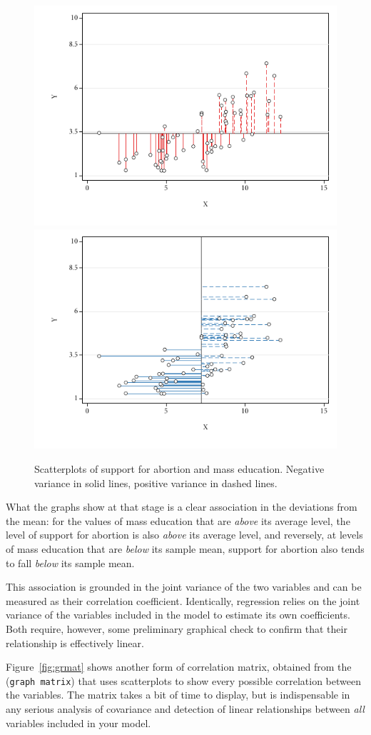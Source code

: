   \begin{figure}[htp]
  	\centering
  	\includegraphics[width=.48\textwidth]{images/abortion_sc_yvariance.pdf}
  	\includegraphics[width=.48\textwidth]{images/abortion_sc_xvariance.pdf}

  	\caption[Variance in two variables]{\label{fig:correlation_variance}%
  	Scatterplots of support for abortion and mass education. %
    Negative variance in solid lines, positive variance in dashed lines. %
    \qog}
  \end{figure}%

  What the graphs show at that stage is a clear association in the deviations from the mean: for the values of mass education that are \emph{above} its average level, the level of support for abortion is also \emph{above} its average level, and reversely, at levels of mass education that are \emph{below} its sample mean, support for abortion also tends to fall \emph{below} its sample mean.%

  This association is grounded in the joint variance of the two variables and can be measured as their correlation coefficient. Identically, regression relies on the joint variance of the variables included in the model to estimate its own coefficients. Both require, however, some preliminary graphical check to confirm that their relationship is effectively linear.%

Figure~\ref{fig:grmat} shows another form of correlation matrix, obtained from the  (\texttt{graph matrix}) that uses scatterplots to show every possible correlation between the variables. The matrix takes a bit of time to display, but is indispensable in any serious analysis of covariance and detection of linear relationships between \emph{all} variables included in your model. 

